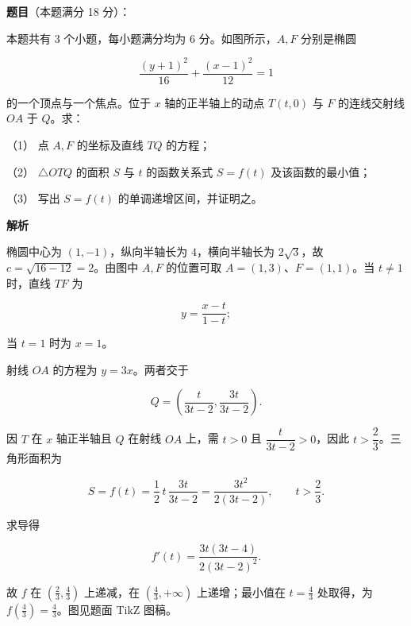 \begin{answer}

\textbf{题目}（本题满分 18 分）：

本题共有 3 个小题，每小题满分均为 6 分。如图所示，$A,F$ 分别是椭圆

\nopagebreak[4]
\[
\frac{(y+1)^2}{16}+\frac{(x-1)^2}{12}=1
\]

的一个顶点与一个焦点。位于 $x$ 轴的正半轴上的动点 $T(t,0)$ 与 $F$ 的连线交射线 $OA$ 于 $Q$。求：
\nopagebreak[4]
\begin{center}\end{center}
\nopagebreak[4]
（1） 点 $A,F$ 的坐标及直线 $TQ$ 的方程；

（2） $\triangle OTQ$ 的面积 $S$ 与 $t$ 的函数关系式 $S=f(t)$ 及该函数的最小值；

（3） 写出 $S=f(t)$ 的单调递增区间，并证明之。

\textbf{解析}


椭圆中心为 $(1,-1)$，纵向半轴长为 $4$，横向半轴长为 $2\sqrt3$，故 $c=\sqrt{16-12}=2$。由图中 $A,F$ 的位置可取 $A=(1,3)$、$F=(1,1)$。当 $t\ne1$ 时，直线 $TF$ 为

\nopagebreak[4]
\[
y=\frac{x-t}{1-t};
\]

当 $t=1$ 时为 $x=1$。


射线 $OA$ 的方程为 $y=3x$。两者交于

\nopagebreak[4]
\[
Q=\left(\frac{t}{3t-2},\frac{3t}{3t-2}\right).
\]

因 $T$ 在 $x$ 轴正半轴且 $Q$ 在射线 $OA$ 上，需 $t>0$ 且 $\dfrac{t}{3t-2}>0$，因此 $t>\dfrac23$。三角形面积为

\nopagebreak[4]
\[
S=f(t)=\frac12\,t\,\frac{3t}{3t-2}=\frac{3t^2}{2(3t-2)},\qquad t>\frac23.
\]


求导得

\nopagebreak[4]
\[
f'(t)=\frac{3t(3t-4)}{2(3t-2)^2}.
\]

故 $f$ 在 $(\frac23,\frac43)$ 上递减，在 $(\frac43,+\infty)$ 上递增；最小值在 $t=\frac43$ 处取得，为 $f(\frac43)=\frac43$。图见题面 TikZ 图稿。




\end{answer}